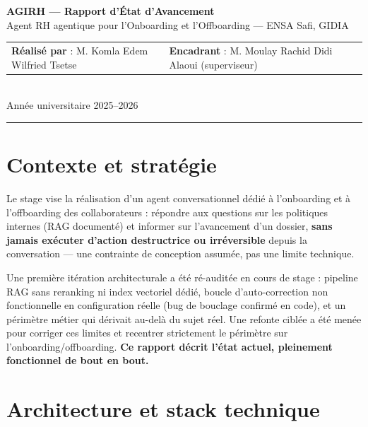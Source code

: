 \documentclass[10.5pt,a4paper]{article}
\begin{document}
\begin{center}
  {\Large\bfseries\color{agirhindigo} AGIRH --- Rapport d'\'Etat d'Avancement}\\[2pt]
  {\normalsize Agent RH agentique pour l'Onboarding et l'Offboarding --- ENSA Safi, GIDIA}\\[4pt]
  {\small
    \begin{tabularx}{\textwidth}{@{}X X@{}}
      \textbf{R\'ealis\'e par} : M. Komla Edem Wilfried Tsetse &
      \textbf{Encadrant} : M. Moulay Rachid Didi Alaoui (superviseur) \\
    \end{tabularx}
  }\\[2pt]
  {\footnotesize Ann\'ee universitaire 2025--2026}
\end{center}
\vspace{2pt}
\hrule
\vspace{4pt}

\section{Contexte et strat\'egie}

Le stage vise la r\'ealisation d'un agent conversationnel d\'edi\'e \`a l'onboarding et \`a l'offboarding des collaborateurs : r\'epondre aux questions sur les politiques internes (RAG document\'e) et informer sur l'avancement d'un dossier, \textbf{sans jamais ex\'ecuter d'action destructrice ou irr\'eversible} depuis la conversation --- une contrainte de conception assum\'ee, pas une limite technique.

Une premi\`ere it\'eration architecturale a \'et\'e r\'e-audit\'ee en cours de stage : pipeline RAG sans reranking ni index vectoriel d\'edi\'e, boucle d'auto-correction non fonctionnelle en configuration r\'eelle (bug de bouclage confirm\'e en code), et un p\'erim\`etre m\'etier qui d\'erivait au-del\`a du sujet r\'eel. Une refonte cibl\'ee a \'et\'e men\'ee pour corriger ces limites et recentrer strictement le p\'erim\`etre sur l'onboarding/offboarding. \textbf{Ce rapport d\'ecrit l'\'etat actuel, pleinement fonctionnel de bout en bout.}

\section{Architecture et stack technique}
\end{document}
